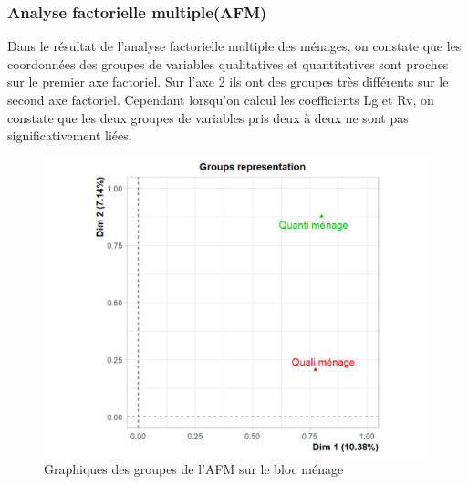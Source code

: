 \documentclass[11pt,a4paper, x11names]{article}\usepackage[]{graphicx}\usepackage[]{color}
\begin{document}
\subsubsection{Analyse factorielle multiple(AFM)}
Dans le résultat de l'analyse factorielle multiple des ménages, on constate que les coordonnées des groupes de variables qualitatives et quantitatives sont proches sur le premier axe factoriel. Sur l'axe 2 ils ont des groupes très différents sur le second axe factoriel. Cependant lorsqu'on calcul les coefficients Lg et Rv, on constate que les deux groupes de variables pris deux à deux ne sont pas significativement liées. 
\begin{figure}[H]
\centering
\includegraphics[scale=0.5]{graphiques/AFM_menage.png}
\caption{Graphiques des groupes de l'AFM sur le bloc ménage } \label{fig8:AFM1}
\end{figure}
\end{document}
